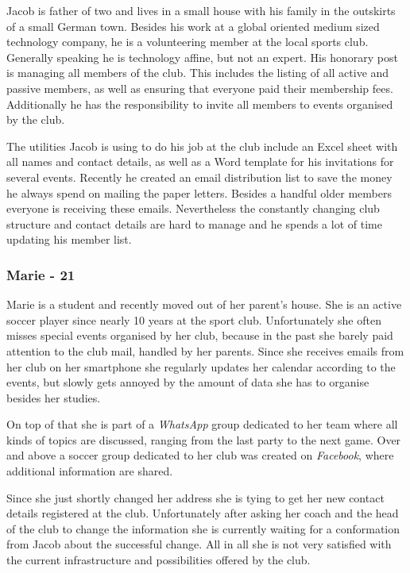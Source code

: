 Jacob is father of two and lives in a small house with his family in the outskirts of a small German town. Besides his work at a global oriented medium sized technology company, he is a volunteering member at the local sports club. Generally speaking he is technology affine, but not an expert. His honorary post is managing all members of the club. This includes the listing of all active and passive members, as well as ensuring that everyone paid their membership fees. Additionally he has the responsibility to invite all members to events organised by the club. 

The utilities Jacob is using to do his job at the club include an Excel sheet with all names and contact details, as well as a Word template for his invitations for several events. Recently he created an email distribution list to save the money he always spend on mailing the paper letters. Besides a handful older members everyone is receiving these emails. Nevertheless the constantly changing club structure and contact details are hard to manage and he spends a lot of time updating his member list.

\subsubsection{Marie - 21}
Marie is a student and recently moved out of her parent's house. She is an active soccer player since nearly 10 years at the sport club. Unfortunately she often misses special events organised by her club, because in the past she barely paid attention to the club mail, handled by her parents. Since she receives emails from her club on her smartphone she regularly updates her calendar according to the events, but slowly gets annoyed by the amount of data she has to organise besides her studies.

On top of that she is part of a \emph{WhatsApp} group dedicated to her team where all kinds of topics are discussed, ranging from the last party to the next game. Over and above a soccer group dedicated to her club was created on \emph{Facebook}, where additional information are shared.

Since she just shortly changed her address she is tying to get her new contact details registered at the club. Unfortunately after asking her coach and the head of the club to change the information she is currently waiting for a conformation from Jacob about the successful change. All in all she is not very satisfied with the current infrastructure and possibilities offered by the club.

